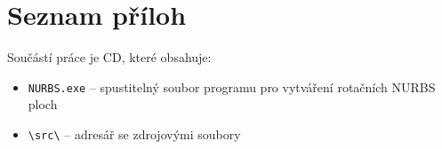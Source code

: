 \chapter*{Seznam příloh}
Součástí práce je CD, které obsahuje:
\begin{itemize}
	\item \verb|NURBS.exe| -- spustitelný soubor programu pro vytváření rotačních NURBS ploch
	\item \verb|\src\| -- adresář se zdrojovými soubory
\end{itemize}
